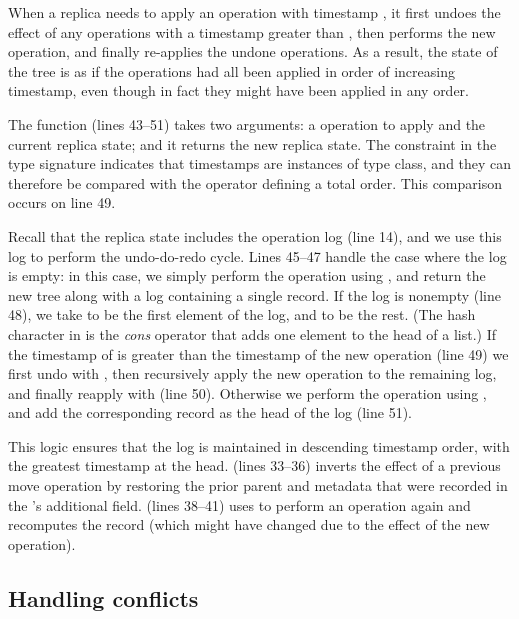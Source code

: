 \documentclass[sigplan,anonymous]{acmart}
\begin{document}
When a replica needs to apply an operation with timestamp , it first undoes the effect of any operations with a timestamp greater than , then performs the new operation, and finally re-applies the undone operations.
As a result, the state of the tree is as if the operations had all been applied in order of increasing timestamp, even though in fact they might have been applied in any order.

The  function (lines 43--51) takes two arguments: a  operation to apply and the current replica state; and it returns the new replica state.
The constraint  in the type signature indicates that timestamps  are instances of  type class, and they can therefore be compared with the \isa{<} operator defining a total order.
This comparison occurs on line 49.

Recall that the replica state includes the operation log (line 14), and we use this log to perform the undo-do-redo cycle.
Lines 45--47 handle the case where the log is empty: in this case, we simply perform the operation using , and return the new tree along with a log containing a single  record.
If the log is nonempty (line 48), we take  to be the first element of the log, and  to be the rest.
(The hash character in  is the \emph{cons} operator that adds one element to the head of a list.)
If the timestamp of  is greater than the timestamp of the new operation (line 49) we first undo  with , then recursively apply the new operation to the remaining log, and finally reapply  with  (line 50).
Otherwise we perform the operation using , and add the corresponding  record as the head of the log (line 51).

This logic ensures that the log is maintained in descending timestamp order, with the greatest timestamp at the head.
 (lines 33--36) inverts the effect of a previous move operation by restoring the prior parent and metadata that were recorded in the 's additional field.
 (lines 38--41) uses  to perform an operation again and recomputes the  record (which might have changed due to the effect of the new operation).

\subsection{Handling conflicts}\label{sec:conflicts}
\end{document}
